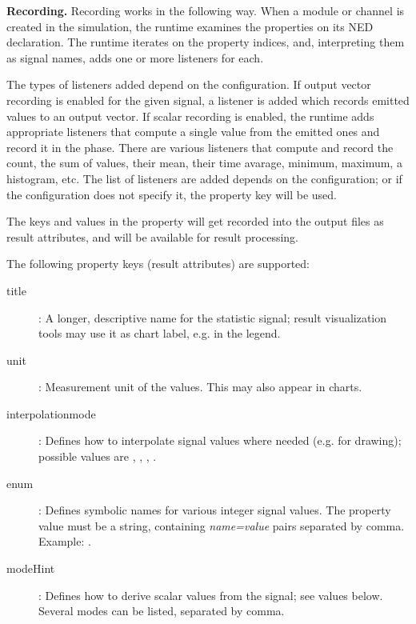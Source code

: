 \textbf{Recording.} Recording works in the following way. When a module or
channel is created in the simulation, the {\opp} runtime examines the
 properties on its NED declaration. The runtime iterates on
the property indices, and, interpreting them as signal names, adds one or
more listeners for each.

The types of listeners added depend on the configuration. If output vector
recording is enabled for the given signal, a listener is added which
records emitted values to an output vector. If scalar recording is enabled,
the runtime adds appropriate listeners that compute a single value from the
emitted ones and record it in the  phase. There are various
listeners that compute and record the count, the sum of values, their mean,
their time avarage, minimum, maximum, a histogram, etc. The list of
listeners are added depends on the configuration; or if the configuration
does not specify it, the  property key will be used.

The keys and values in the property will get recorded into the output files
as result attributes, and will be available for result processing.

The following property keys (result attributes) are supported:

\begin{description}
  \item[title]: A longer, descriptive name for the statistic signal; result
      visualization tools may use it as chart label, e.g. in the legend.
  \item[unit]: Measurement unit of the values. This may also appear in charts.
  \item[interpolationmode]: Defines how to interpolate signal values where
      needed (e.g. for drawing); possible values are ,
      , , .
  \item[enum]: Defines symbolic names for various integer signal values.
      The property value must be a string, containing \textit{name=value} pairs
      separated by comma. Example: .
  \item[modeHint]: Defines how to derive scalar values from the signal;
     see values below. Several modes can be listed, separated by comma.
\end{description}

